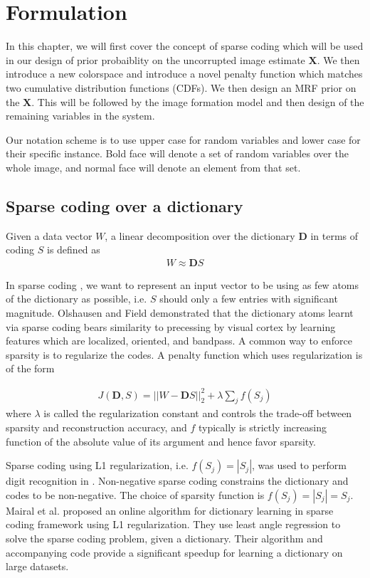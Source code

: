 \chapter{Formulation}

In this chapter, we will first cover the concept of sparse coding which will be used in our design of prior probaiblity on the uncorrupted image estimate $\mathbf{X}$. We then introduce a new colorspace and introduce a novel penalty function which matches two cumulative distribution functions (CDFs). We then design an MRF prior on the $\mathbf{X}$. This will be followed by the image formation model and then design of the remaining variables in the system.

Our notation scheme is to use upper case for random variables and lower case for their specific instance. Bold face will denote a set of random variables over the whole image, and normal face will denote an element from that set.

\section{Sparse coding over a dictionary}
Given a data vector $W$, a linear decomposition over the dictionary $\mathbf{D}$ in terms of coding $S$ is defined as
\begin{align}
    W \approx \mathbf{D} S \label{eqn:lineardecomp}
\end{align}

In sparse coding \cite{harpur1996sc}, we want to represent an input vector to be using as few atoms of the dictionary as possible, i.e. $S$ should only a few entries with significant magnitude. Olshausen and Field\cite{olshausen1996sparse} demonstrated that the dictionary atoms learnt via sparse coding bears similarity to precessing by visual cortex by learning features which are localized, oriented, and bandpass. A common way to enforce sparsity is to regularize the codes. A penalty function which uses regularization is of the form

\begin{align}
    J(\mathbf{D}, S) = || W - \mathbf{D} S ||_2^2 + \lambda \sum_{j} f(S_{j}) \label{eqn:sparsecoding}
\end{align}
where $\lambda$ is called the regularization constant and controls the trade-off between sparsity and reconstruction accuracy, and $f$ typically is strictly increasing function of the absolute value of its argument and hence favor sparsity.

Sparse coding using L1 regularization, i.e. $f(S_{j}) = | S_{j} |$, was used to perform digit recognition in \cite{mairal2009supervised}. Non-negative sparse coding \cite{hoyer2002nnsc} constrains the dictionary and codes to be non-negative. The choice of sparsity function is $f(S_{j}) = | S_{j} | = S_{j}$. Mairal et al. \cite{mairal2009online} proposed an online algorithm for dictionary learning in sparse coding framework using L1 regularization. They use least angle regression to solve the sparse coding problem, given a dictionary. Their algorithm and accompanying code provide a significant speedup for learning a  dictionary on large datasets.

